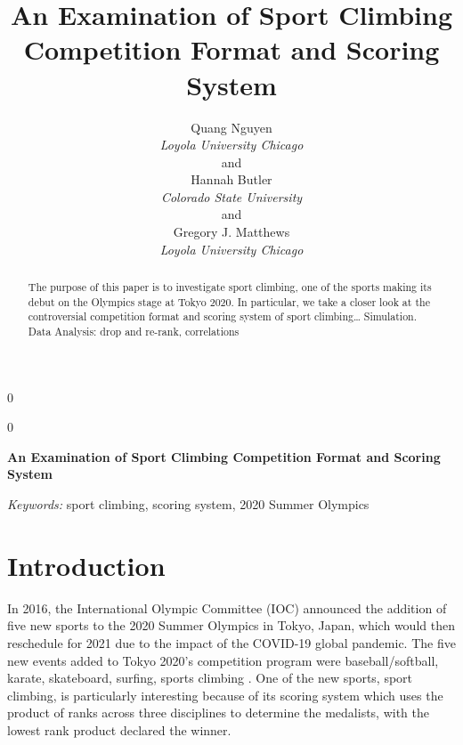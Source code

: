 \documentclass[12pt]{article}
\newcommand{\blind}{0}
\begin{document}
\def\spacingset#1{\renewcommand{\baselinestretch}%
{#1}\small\normalsize} \spacingset{1}



\blind
{
  \title{\bf An Examination of Sport Climbing Competition Format and
Scoring System}

  \author{
        Quang Nguyen \\
    \textit{Loyola University Chicago}\\
     and \\     Hannah Butler \\
    \textit{Colorado State University}\\
     and \\     Gregory J. Matthews \\
    \textit{Loyola University Chicago}\\
      }
  \maketitle
} \fi

\blind
{
  \bigskip
  \bigskip
  \bigskip
  \begin{center}
    {\LARGE\bf An Examination of Sport Climbing Competition Format and
Scoring System}
  \end{center}
  \medskip
} \fi

\bigskip
\begin{abstract}
The purpose of this paper is to investigate sport climbing, one of the
sports making its debut on the Olympics stage at Tokyo 2020. In
particular, we take a closer look at the controversial competition
format and scoring system of sport climbing\ldots{} Simulation. Data
Analysis: drop and re-rank, correlations
\end{abstract}

\noindent%
{\it Keywords:} sport climbing, scoring system, 2020 Summer Olympics
\vfill

\newpage
\spacingset{1.45} %

\hypertarget{introduction}{%
\section{Introduction}\label{introduction}}

In 2016, the International Olympic Committee (IOC) announced the
addition of five new sports to the 2020 Summer Olympics in Tokyo, Japan,
which would then reschedule for 2021 due to the impact of the COVID-19
global pandemic. The five new events added to Tokyo 2020's competition
program were baseball/softball, karate, skateboard, surfing, sports
climbing \citep{ioc2016}. One of the new sports, sport climbing, is
particularly interesting because of its scoring system which uses the
product of ranks across three disciplines to determine the medalists,
with the lowest rank product declared the winner.
\end{document}
